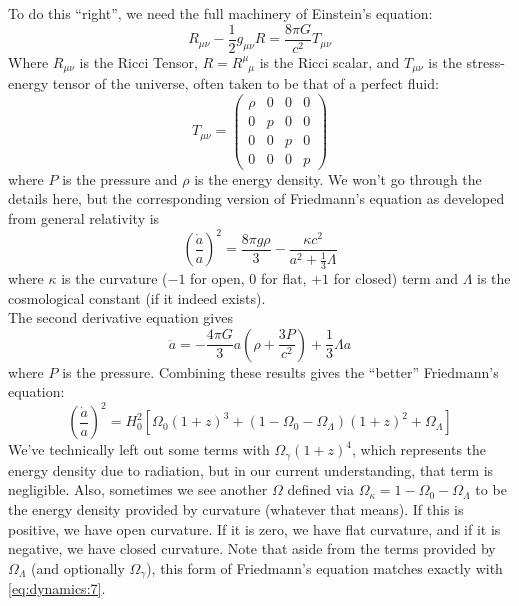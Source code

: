 \documentclass[10pt]{article}
\numberwithin{equation}{section}
\newcommand{\n}{\noindent}
\begin{document}
		\n To do this ``right'', we need the full machinery of Einstein's equation:
		\begin{equation}
			\label{eq:dynamics:8} R_{\mu\nu}-\frac{1}{2}g_{\mu\nu}R = \frac{8\pi G}{c^2}T_{\mu\nu}
		\end{equation}
		Where $R_{\mu\nu}$ is the Ricci Tensor, $R=R^\mu_{\phantom{\mu}\mu}$ is the Ricci scalar, and $T_{\mu\nu}$ is the stress-energy tensor of the universe, often taken to be that of a perfect fluid:
		\begin{equation}
			\label{eq:dynamics:9}
			T_{\mu\nu} = \begin{pmatrix}
			\rho & 0 & 0 & 0\\
			0 & p & 0 & 0\\
			0 & 0 & p & 0\\
			0 & 0 & 0 & p \end{pmatrix}
		\end{equation}
		where $P$ is the pressure and $\rho$ is the energy density. We won't go through the details here, but the corresponding version of Friedmann's equation as developed from general relativity is
		\begin{equation}
			\label{eq:dynamics:10} \left(\frac{\dot{a}}{a}\right)^2 = \frac{8\pi g\rho}{3}-\frac{\kappa c^2}{a^2 + \frac{1}{3}\Lambda}
		\end{equation}
		where $\kappa$ is the curvature ($-1$ for open, $0$ for flat, $+1$ for closed) term and $\Lambda$ is the cosmological constant (if it indeed exists).\\
		
		\n The second derivative equation gives
		\begin{equation}
			\label{eq:dynamics:11} \ddot{a} = -\frac{4\pi G}{3}a\left(\rho + \frac{3P}{c^2}\right)+\frac{1}{3}\Lambda a
		\end{equation}
		where $P$ is the pressure. Combining these results gives the ``better'' Friedmann's equation:
		\begin{equation}
			\label{eq:dynamics:12}\boxed{\left(\frac{\dot{a}}{a}\right)^2 = H_0^2\left[\Omega_0\left(1+z\right)^3+(1-\Omega_0-\Omega_\Lambda)(1+z)^2 + \Omega_\Lambda\right]}
		\end{equation}
		We've technically left out some terms with $\Omega_\gamma(1+z)^4$, which represents the energy density due to radiation, but in our current understanding, that term is negligible. Also, sometimes we see another $\Omega$ defined via $\Omega_\kappa = 1-\Omega_0-\Omega_\Lambda$ to be the energy density provided by curvature (whatever that means). If this is positive, we have open curvature. If it is zero, we have flat curvature, and if it is negative, we have closed curvature. Note that aside from the terms provided by $\Omega_\Lambda$ (and optionally $\Omega_\gamma$), this form of Friedmann's equation matches exactly with \eqref{eq:dynamics:7}.\\
		
\end{document}

